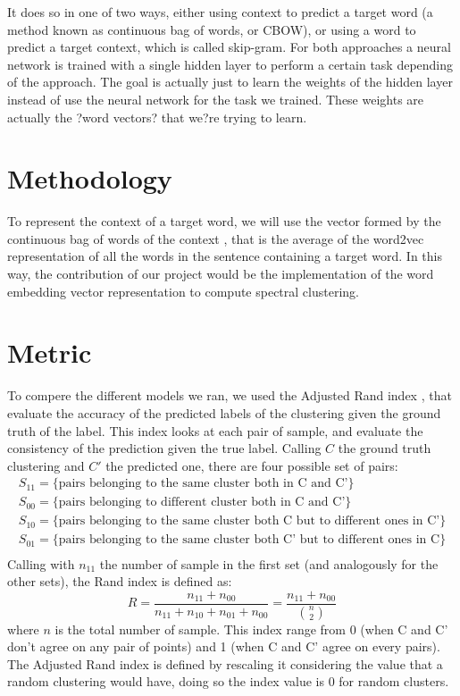 \documentclass[]{article}
\begin{document}
It does so in one of two ways, either using context to predict a target word (a method known as continuous bag of words, or CBOW), or using a word to predict a target context, which is called skip-gram. For both approaches a neural network is trained with a single hidden layer to perform a certain task depending of the approach. The goal is actually just to learn the weights of the hidden layer instead of use the neural network for the task we trained. These weights are actually the ?word vectors? that we?re trying to learn.

\section{Methodology}

To represent the context of a target word, we will use the vector formed by the continuous bag of words of the context \cite{vecSp}, that is the average of the word2vec \cite{word2vec} representation of all the words in the sentence containing a target word. In this way, the contribution of our project would be the implementation of the word embedding vector representation to compute spectral clustering. \\


\section{Metric}
To compere the different models we ran, we used the Adjusted Rand index \cite{rand},  that evaluate the accuracy of the predicted labels of the clustering given the ground truth of the label. 
This index looks at each pair of sample, and evaluate the consistency of the prediction given the true label. Calling $C$ the ground truth clustering and $C'$ the predicted one, there are four possible set of pairs:
$$
\begin{array}{ll}
S_{11} = \{\text{pairs belonging to the same cluster both in C and C'} \}\\
S_{00} =  \{\text{pairs belonging to different cluster both in C and C'} \}\\
S_{10} =  \{\text{pairs belonging to the same cluster both C but to different ones in C'} \}\\
S_{01} =  \{\text{pairs belonging to the same cluster both C' but to different ones in C} \}\\
\end{array}
$$
Calling with $n_{11}$ the number of sample in the first set (and analogously for the other sets), the Rand index is defined as:
$$
R=\frac{n_{11}+n_{00}}{n_{11}+n_{10}+n_{01}+n_{00}} = \frac{n_{11}+n_{00}}{{ n\choose 2}}
$$
where $n$ is the total number of sample. This index range from 0 (when C and C' don't agree on any pair of points) and 1 (when C and C' agree on every pairs). The Adjusted Rand index is defined by rescaling it considering the value that a random clustering would have, doing so the index value is 0 for random clusters. 
\end{document}
